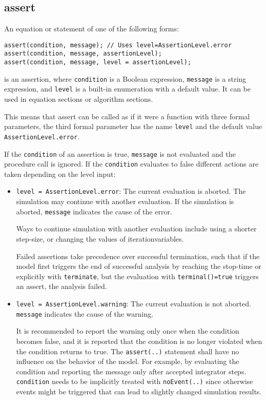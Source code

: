 \subsection{assert}

An equation or statement of one of the following forms:
\begin{lstlisting}[language=modelica]
assert(condition, message); // Uses level=AssertionLevel.error
assert(condition, message, assertionLevel);
assert(condition, message, level = assertionLevel);
\end{lstlisting}

is an assertion, where \lstinline!condition! is a Boolean expression, \lstinline!message! is a
string expression, and \lstinline!level! is a built-in enumeration with a default
value. It can be used in equation sections or algorithm sections.

\begin{nonnormative}
This means that assert can be called as if it were a function with three formal parameters, the third formal parameter has the
name \lstinline!level! and the default value \lstinline!AssertionLevel.error!.
\end{nonnormative}

If the \lstinline!condition! of an assertion is true, \lstinline!message! is not evaluated and
the procedure call is ignored. If the \lstinline!condition! evaluates to false
different actions are taken depending on the level input:
\begin{itemize}
\item
  \lstinline!level = AssertionLevel.error!: The current evaluation is aborted. The
  simulation may continue with another evaluation. If the simulation is aborted, \lstinline!message! indicates the
  cause of the error.
  \begin{nonnormative}
  Ways to continue simulation with another evaluation include using a shorter step-size, or changing the values of iterationvariables.
  \end{nonnormative}
  Failed assertions take precedence over successful termination, such
  that if the model first triggers the end of successful analysis by
  reaching the stop-time or explicitly with \lstinline!terminate!, but the
  evaluation with \lstinline!terminal()=true! triggers an assert, the analysis
  failed.
\item
  \lstinline!level = AssertionLevel.warning!: The current evaluation is not aborted.
  \lstinline!message! indicates the cause of the warning.
  \begin{nonnormative}
  It is recommended to report the warning only once when the condition becomes false, and it is reported that the condition is no longer
  violated when the condition returns to true. The \lstinline!assert(..)! statement shall have no influence on the behavior of the model.
  For example, by evaluating the condition and reporting the message only after accepted integrator steps.  \lstinline!condition! needs to
  be implicitly treated with \lstinline!noEvent(..)! since otherwise events might be triggered that can lead to slightly changed simulation results.
  \end{nonnormative}
\end{itemize}

